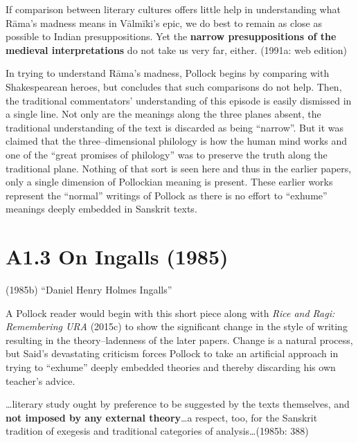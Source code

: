 \begin{myquote}
If comparison between literary cultures offers little help in understanding what Rāma’s madness means in Vālmīki’s epic, we do best to remain as close as possible to Indian presuppositions. Yet the \textbf{narrow presuppositions of the medieval interpretations }do not take us very far, either. (1991a: web edition)
\end{myquote}

In trying to understand Rāma’s madness, Pollock begins by comparing with Shakespearean heroes, but concludes that such comparisons do not help. Then, the traditional commentators' understanding of this episode is easily dismissed in a single line. Not only are the meanings along the three planes absent, the traditional understanding of the text is discarded as being “narrow”. But it was claimed that the three–dimensional philology is how the human mind works and one of the “great promises of philology” was to preserve the truth along the traditional plane. Nothing of that sort is seen here and thus in the earlier papers, only a single dimension of Pollockian meaning is present. These earlier works represent the “normal” writings of Pollock as there is no effort to “exhume” meanings deeply embedded in Sanskrit texts.

\vspace{-.3cm}

\section*{A1.3 On Ingalls (1985)}

\vspace{-.2cm}

(1985b) “Daniel Henry Holmes Ingalls”

A Pollock reader would begin with this short piece along with \textit{Rice and Ragi: Remembering URA} (2015c) to show the significant change in the style of writing resulting in the theory–ladenness of the later papers. Change is a natural process, but Said’s devastating criticism forces Pollock to take an artificial approach in trying to “exhume” deeply embedded theories and thereby discarding his own teacher’s advice.

\begin{myquote}
…literary study ought by preference to be suggested by the texts themselves, and \textbf{not imposed by any external theory}…a respect, too, for the Sanskrit tradition of exegesis and traditional categories of analysis…(1985b: 388)
\end{myquote}

